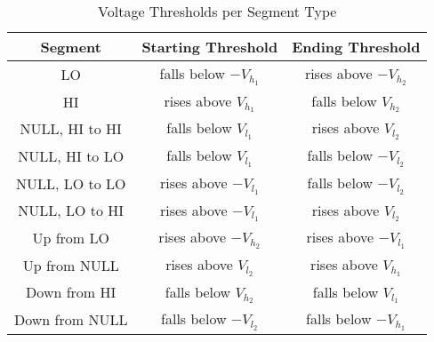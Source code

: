 \documentclass[english]{llncs}
\begin{document}
  \begin{table}
    \caption{Voltage Thresholds per Segment Type}
    \label{tab:SegmentationLevels}
    \centering
    \begin{tabular}{|c c c|} 
      \hline
      Segment & Starting Threshold & Ending Threshold \\ [0.5ex] 
      \hline\hline
      LO & falls below $-V_{h_1}$ & rises above $-V_{h_2}$ \\
      \hline
      HI & rises above $V_{h_1}$ & falls below $V_{h_2}$ \\
      \hline
      NULL, HI to HI & falls below $V_{l_1}$ & rises above $V_{l_2}$ \\
      \hline
      NULL, HI to LO & falls below $V_{l_1}$ & falls below $-V_{l_2}$ \\
      \hline
      NULL, LO to LO & rises above $-V_{l_1}$ & falls below $-V_{l_2}$ \\
      \hline
      NULL, LO to HI & rises above $-V_{l_1}$ & rises above $V_{l_2}$ \\
      \hline
      Up from LO & rises above $-V_{h_2}$ & rises above $-V_{l_1}$ \\
      \hline
      Up from NULL & rises above $V_{l_2}$ & rises above $V_{h_1}$ \\
      \hline
      Down from HI & falls below $V_{h_2}$ & falls below $V_{l_1}$ \\
      \hline
      Down from NULL & falls below $-V_{l_2}$ & falls below $-V_{h_1}$ \\
      \hline
    \end{tabular}
  \end{table}
  
  \begin{table}
    \caption{Number of Features per Segment Type}
    \label{tab:feature_set_sizes}
    \centering
  \end{table}
\end{document}
